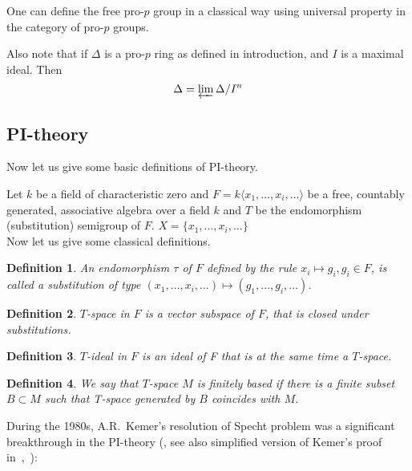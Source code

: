 \documentclass[12pt,a4paper]{article}
\newtheorem{definition}{Definition}[subsection]
\begin{document}
    One can define the free pro-$p$ group in a classical way using universal property in the category of pro-$p$ groups.

    Also note that if $\Delta$ is a pro-$p$ ring as defined in introduction, and $I$ is a maximal ideal.
    Then
    \[ \Delta = \varprojlim \Delta/I^n \]

    \subsection{PI-theory}
    Now let us give some basic definitions of PI-theory.

    Let $k$ be a field of characteristic zero and $F = k\langle x_1,\ldots,x_i,\ldots\rangle$ be a free, countably generated, associative algebra over a field $k$ and $T$ be the endomorphism (substitution) semigroup of $F$. $X = \{ x_1,\ldots,x_i,\ldots\}$\\
    Now let us give some classical definitions.

    \vskip 0.1in\noindent
    \begin{definition}
        An endomorphism $\tau$ of $F$ defined by the rule $x_i \mapsto g_i, g_i \in F$, is called a substitution of type
        $(x_1,\ldots,x_i,\ldots) \mapsto (g_1,\ldots,g_i,\ldots)$.
    \end{definition}
    \vskip 0.1in\noindent

    \vskip 0.1in\noindent
    \begin{definition}
        $T$-space in $F$ is a vector subspace of $F$, that is closed under substitutions.
    \end{definition}
    \vskip 0.1in\noindent

    \vskip 0.1in\noindent
    \begin{definition}
        $T$-ideal in $F$ is an ideal of F that is at the same time a $T$-space.
    \end{definition}
    \vskip 0.1in\noindent

    \vskip 0.1in\noindent
    \begin{definition}
        We say that $T$-space $M$ is finitely based if there is a finite subset $B\subset M$ such that T-space generated by $B$ coincides with $M$.
    \end{definition}
    \vskip 0.1in\noindent

    During the 1980s, A.R.\ Kemer's resolution of Specht problem was a significant breakthrough in the PI-theory (\cite{Kemer}, see also simplified version of Kemer's proof in~\cite{Aljadeff-Kanel-Karasik},~\cite{Procesi}):
\end{document}
